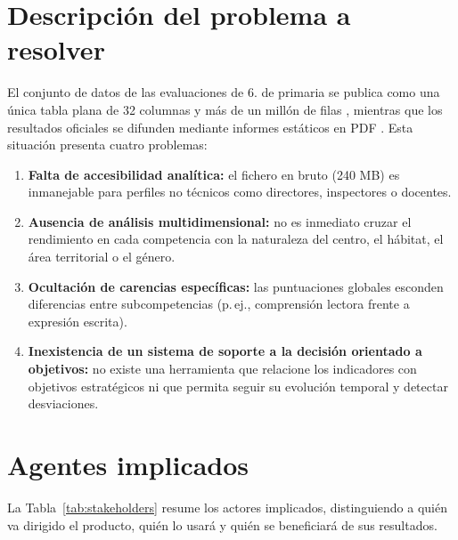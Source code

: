 \documentclass[12pt, a4paper, oneside]{report}
\begin{document}
\section{Descripción del problema a resolver}
El conjunto de datos de las evaluaciones de 6.\textordmasculine{} de primaria se publica como una única tabla plana de 32 columnas y más de un millón de filas \cite{transparencia_catalunya_2024}, mientras que los resultados oficiales se difunden mediante informes estáticos en PDF \cite{csase_resultats}. Esta situación presenta cuatro problemas:
\begin{enumerate}
    \item \textbf{Falta de accesibilidad analítica:} el fichero en bruto (240 MB) es inmanejable para perfiles no técnicos como directores, inspectores o docentes.
    \item \textbf{Ausencia de análisis multidimensional:} no es inmediato cruzar el rendimiento en cada competencia con la naturaleza del centro, el hábitat, el área territorial o el género.
    \item \textbf{Ocultación de carencias específicas:} las puntuaciones globales esconden diferencias entre subcompetencias (p.\,ej., comprensión lectora frente a expresión escrita).
    \item \textbf{Inexistencia de un sistema de soporte a la decisión orientado a objetivos:} no existe una herramienta que relacione los indicadores con objetivos estratégicos ni que permita seguir su evolución temporal y detectar desviaciones.
\end{enumerate}

\section{Agentes implicados}
La Tabla~\ref{tab:stakeholders} resume los actores implicados, distinguiendo a quién va dirigido el producto, quién lo usará y quién se beneficiará de sus resultados.
\end{document}
